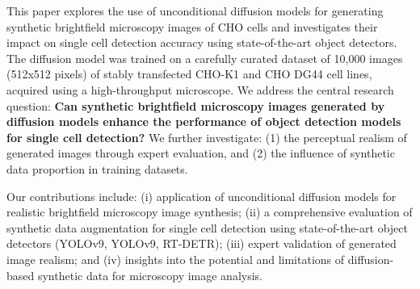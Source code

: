 This paper explores the use of unconditional diffusion models for generating synthetic brightfield microscopy images of CHO cells and investigates their impact on single cell detection accuracy using state-of-the-art object detectors.
The diffusion model was trained on a carefully curated dataset of 10,000 images (512x512 pixels) of stably transfected CHO-K1 and CHO DG44 cell lines, acquired using a high-throughput microscope.
We address the central research question: \textbf{Can synthetic brightfield microscopy images generated by diffusion models enhance the performance of object detection models for single cell detection?}
We further investigate: (1) the perceptual realism of generated images through expert evaluation, and (2) the influence of synthetic data proportion in training datasets.

Our contributions include: (i) application of unconditional diffusion models for realistic brightfield microscopy image synthesis;
(ii) a comprehensive evaluation of synthetic data augmentation for single cell detection using state-of-the-art object detectors (YOLOv9, YOLOv9, RT-DETR);
(iii) expert validation of generated image realism;
and (iv) insights into the potential and limitations of diffusion-based synthetic data for microscopy image analysis.
